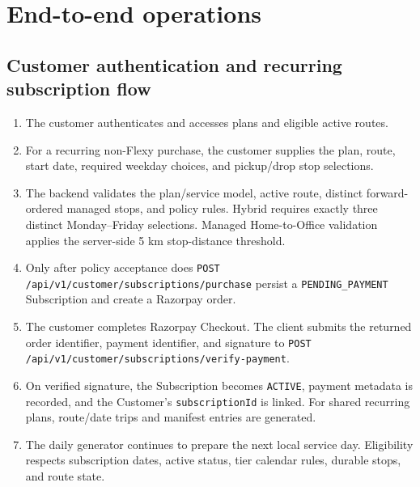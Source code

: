 \documentclass[11pt,a4paper]{article}
\newcommand{\code}[1]{\texttt{#1}}
\begin{document}
\section{End-to-end operations}
\subsection{Customer authentication and recurring subscription flow}
\begin{enumerate}
  \item The customer authenticates and accesses plans and eligible active routes.
  \item For a recurring non-Flexy purchase, the customer supplies the plan, route, start date, required weekday choices, and pickup/drop stop selections.
  \item The backend validates the plan/service model, active route, distinct forward-ordered managed stops, and policy rules. Hybrid requires exactly three distinct Monday--Friday selections. Managed Home-to-Office validation applies the server-side 5 km stop-distance threshold.
  \item Only after policy acceptance does \code{POST /api/v1/customer/subscriptions/purchase} persist a \code{PENDING\_PAYMENT} Subscription and create a Razorpay order.
  \item The customer completes Razorpay Checkout. The client submits the returned order identifier, payment identifier, and signature to \code{POST /api/v1/customer/subscriptions/verify-payment}.
  \item On verified signature, the Subscription becomes \code{ACTIVE}, payment metadata is recorded, and the Customer's \code{subscriptionId} is linked. For shared recurring plans, route/date trips and manifest entries are generated.
  \item The daily generator continues to prepare the next local service day. Eligibility respects subscription dates, active status, tier calendar rules, durable stops, and route state.
\end{enumerate}
\end{document}
